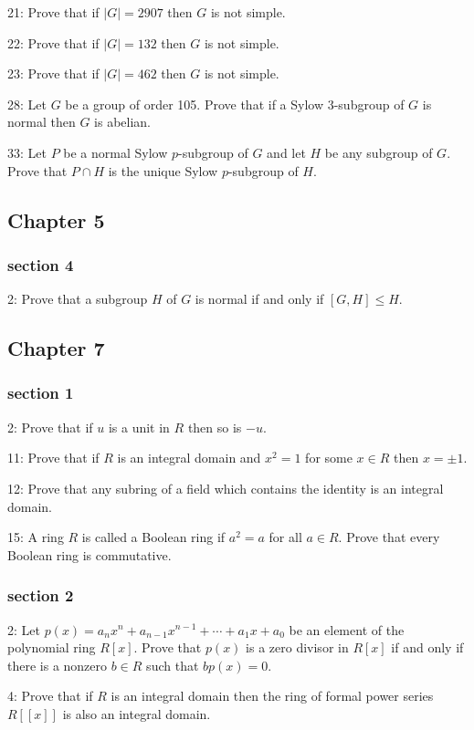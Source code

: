 \documentclass{article}
\begin{document}
21: Prove that if $|G|=2907$ then $G$ is not simple.

22: Prove that if $|G|=132$ then $G$ is not simple.

23: Prove that if $|G|=462$ then $G$ is not simple.

28: Let $G$ be a group of order 105. Prove that if a Sylow 3-subgroup of $G$ is normal then $G$ is abelian.

33: Let $P$ be a normal Sylow $p$-subgroup of $G$ and let $H$ be any subgroup of $G$. Prove that $P \cap H$ is the unique Sylow $p$-subgroup of $H$.

\subsection*{Chapter 5}
\subsubsection*{section 4}
2: Prove that a subgroup $H$ of $G$ is normal if and only if $[G, H] \leq H$.

\subsection*{Chapter 7}
\subsubsection{section 1}
2: Prove that if $u$ is a unit in $R$ then so is $-u$.

11: Prove that if $R$ is an integral domain and $x^{2}=1$ for some $x \in R$ then $x=\pm 1$.

12: Prove that any subring of a field which contains the identity is an integral domain.

15: A ring $R$ is called a Boolean ring if $a^{2}=a$ for all $a \in R$. Prove that every Boolean ring is commutative.

\subsubsection*{section 2}
2: Let $p(x)=a_{n} x^{n}+a_{n-1} x^{n-1}+\cdots+a_{1} x+a_{0}$ be an element of the polynomial ring $R[x]$. Prove that $p(x)$ is a zero divisor in $R[x]$ if and only if there is a nonzero $b \in R$ such that $b p(x)=0$. 

4: Prove that if $R$ is an integral domain then the ring of formal power series $R[[x]]$ is also an integral domain.
\end{document}
